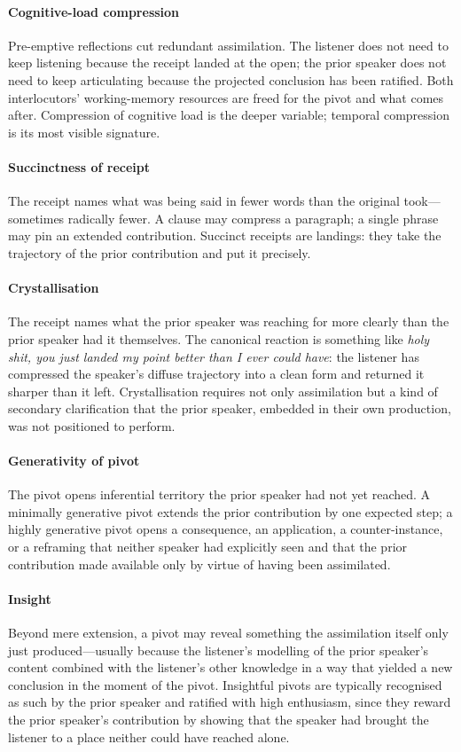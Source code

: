 \paragraph{Cognitive-load compression} Pre-emptive reflections cut redundant assimilation. The listener does not need to keep listening because the receipt landed at the open; the prior speaker does not need to keep articulating because the projected conclusion has been ratified. Both interlocutors' working-memory resources are freed for the pivot and what comes after. Compression of cognitive load is the deeper variable; temporal compression is its most visible signature.

\paragraph{Succinctness of receipt} The receipt names what was being said in fewer words than the original took---sometimes radically fewer. A clause may compress a paragraph; a single phrase may pin an extended contribution. Succinct receipts are landings: they take the trajectory of the prior contribution and put it precisely.

\paragraph{Crystallisation} The receipt names what the prior speaker was reaching for more clearly than the prior speaker had it themselves. The canonical reaction is something like \emph{holy shit, you just landed my point better than I ever could have}: the listener has compressed the speaker's diffuse trajectory into a clean form and returned it sharper than it left. Crystallisation requires not only assimilation but a kind of secondary clarification that the prior speaker, embedded in their own production, was not positioned to perform.

\paragraph{Generativity of pivot} The pivot opens inferential territory the prior speaker had not yet reached. A minimally generative pivot extends the prior contribution by one expected step; a highly generative pivot opens a consequence, an application, a counter-instance, or a reframing that neither speaker had explicitly seen and that the prior contribution made available only by virtue of having been assimilated.

\paragraph{Insight} Beyond mere extension, a pivot may reveal something the assimilation itself only just produced---usually because the listener's modelling of the prior speaker's content combined with the listener's other knowledge in a way that yielded a new conclusion in the moment of the pivot. Insightful pivots are typically recognised as such by the prior speaker and ratified with high enthusiasm, since they reward the prior speaker's contribution by showing that the speaker had brought the listener to a place neither could have reached alone.

